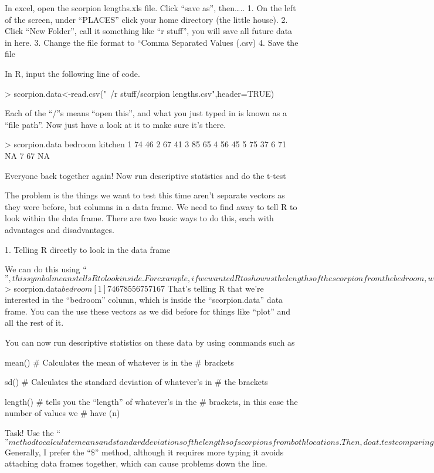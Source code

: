 \documentclass{article}
\begin{document}
In excel, open the scorpion lengths.xls file. Click “save as”, then…..
    1. On the left of the screen, under “PLACES” click your home directory (the little house). 
    2. Click “New Folder”, call it something like “r stuff”, you will save all future data in here. 
    3. Change the file format to “Comma Separated Values (.csv) 
    4. Save the file

In R, input the following line of code.

> scorpion.data<-read.csv("~/r stuff/scorpion lengths.csv",header=TRUE)

Each of the “/”s means “open this”, and what you just typed in is known as a “file path”. Now just have a look at it to make sure it’s there.

> scorpion.data
  bedroom kitchen
1      74      46
2      67      41
3      85      65
4      56      45
5      75      37
6      71      NA
7      67      NA

Everyone back together again! Now run descriptive statistics and do the t-test

The problem is the things we want to test this time aren’t separate vectors as they were before, but columns in a data frame. We need to find away to tell R to look within the data frame. There are two basic ways to do this, each with advantages and disadvantages.

    1. Telling R directly to look in the data frame

We can do this using “$”, this symbol means tells R to look inside. For example, if we wanted R to show us the lengths of the scorpion from the bedroom, we can type
$
> scorpion.data$bedroom
[1] 74 67 85 56 75 71 67
$
That’s telling R that we’re interested in the “bedroom” column, which is inside the “scorpion.data” data frame. You can the use these vectors as we did before for things like “plot” and all the rest of it.

You can now run descriptive statistics on these data by using commands such as 

mean() \# Calculates the mean of whatever is in the
	  \# brackets

sd() \# Calculates the standard deviation of whatever’s in
     \# the brackets

length() \# tells you the “length” of whatever’s in the
         \# brackets, in this case the number of values we
         \# have (n)

Task! Use the “$” method to calculate means and standard deviations of the lengths of scorpions from both locations. Then, do a t.test comparing the lengths of the scorpions. If you manage this easily, write a function to calculate the standard error, and run it on the scorpion data. 
$
Generally, I prefer the “\$” method, although it requires more typing it avoids attaching data frames together, which can cause problems down the line.
\end{document}
